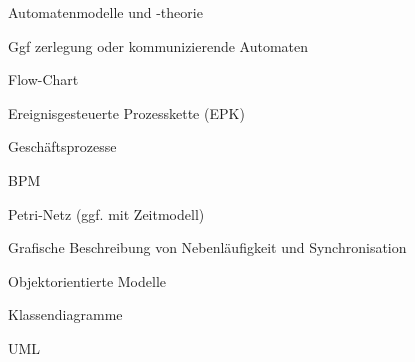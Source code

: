 \documentclass[a4paper]{article}
\begin{document}
\begin{multicols}{3}
\begin{itemize*}
\begin{itemize*}
\begin{itemize*}
                    \item Automatenmodelle und -theorie
                    \item Ggf zerlegung oder kommunizierende Automaten
                  \end{itemize*}
            \item Flow-Chart
            \item Ereignisgesteuerte Prozesskette (EPK)
                  \begin{itemize*}
                    \item Geschäftsprozesse
                    \item BPM
                  \end{itemize*}
            \item Petri-Netz (ggf. mit Zeitmodell)
                  \begin{itemize*}
                    \item Grafische Beschreibung von Nebenläufigkeit und Synchronisation
                  \end{itemize*}
          \end{itemize*}
    \item Objektorientierte Modelle
          \begin{itemize*}
            \item Klassendiagramme
            \item UML
          \end{itemize*}
  \end{itemize*}



\end{multicols}
\end{document}
